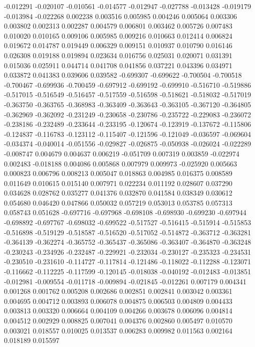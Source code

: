 -0.012291
-0.020107
-0.010561
-0.014577
-0.012947
-0.027788
-0.013428
-0.019179
-0.013984
-0.022268
0.002238
0.003516
0.005985
0.004246
0.005064
0.003306
0.003802
0.002313
0.002287
0.004579
0.006801
0.003462
0.005726
0.007483
0.010020
0.010165
0.009106
0.005985
0.009216
0.010663
0.012414
0.006824
0.019672
0.014787
0.019449
0.006329
0.009151
0.010937
0.010790
0.016146
0.026308
0.019188
0.019894
0.023634
0.016756
0.025031
0.020071
0.031391
0.015036
0.025911
0.044714
0.041708
0.041856
0.037221
0.043396
0.034971
0.033872
0.041383
0.039606
0.039582
-0.699307
-0.699622
-0.700504
-0.700518
-0.700467
-0.699936
-0.700459
-0.697912
-0.699192
-0.699910
-0.516710
-0.519886
-0.517015
-0.516549
-0.516457
-0.517559
-0.516598
-0.518621
-0.518032
-0.517019
-0.363750
-0.363765
-0.368983
-0.363409
-0.363643
-0.363105
-0.367120
-0.364805
-0.362969
-0.362092
-0.231249
-0.230658
-0.230786
-0.235722
-0.229083
-0.236072
-0.238186
-0.232489
-0.233644
-0.233195
-0.120674
-0.123919
-0.137672
-0.115806
-0.124837
-0.116783
-0.123112
-0.115407
-0.121596
-0.121049
-0.036597
-0.069604
-0.034374
-0.040014
-0.051556
-0.029827
-0.026875
-0.050938
-0.026024
-0.022289
-0.008747
0.004679
0.004637
0.006219
-0.051709
0.007319
0.003859
-0.022974
0.002483
-0.018188
0.004086
0.005868
0.007979
0.009973
-0.025920
0.005663
0.000823
0.006796
0.008213
0.005047
0.018863
0.004985
0.016375
0.008589
0.011649
0.010615
0.015140
0.007971
0.022234
0.011192
0.028607
0.037290
0.034628
0.028762
0.035277
0.041376
0.032870
0.041584
0.038349
0.030612
0.054680
0.046420
0.047866
0.050032
0.057219
0.053013
0.053785
0.057313
0.058743
0.051628
-0.697716
-0.697968
-0.698108
-0.698930
-0.699230
-0.697944
-0.698892
-0.697767
-0.698032
-0.699522
-0.517527
-0.516415
-0.515914
-0.515853
-0.516898
-0.519129
-0.518587
-0.516520
-0.517052
-0.514872
-0.363712
-0.363281
-0.364139
-0.362274
-0.365752
-0.365437
-0.365086
-0.363407
-0.364870
-0.363248
-0.230243
-0.234926
-0.232487
-0.229921
-0.232034
-0.230127
-0.235323
-0.234531
-0.230510
-0.231610
-0.114727
-0.117814
-0.121486
-0.118022
-0.112288
-0.123071
-0.116662
-0.112225
-0.117599
-0.120145
-0.018038
-0.040192
-0.012483
-0.013851
-0.012981
-0.009554
-0.011718
-0.009894
-0.021845
-0.012261
0.007179
0.004341
0.001268
0.001762
0.005208
0.002686
0.002851
0.002841
0.003042
0.003361
0.004695
0.004712
0.003893
0.006078
0.004875
0.006503
0.004809
0.004433
0.003813
0.003320
0.006664
0.004109
0.004266
0.003678
0.006096
0.004814
0.004512
0.002929
0.008825
0.007041
0.004376
0.002860
0.005497
0.010570
0.003021
0.018557
0.010025
0.013537
0.006283
0.009982
0.011563
0.002164
0.018189
0.015597
